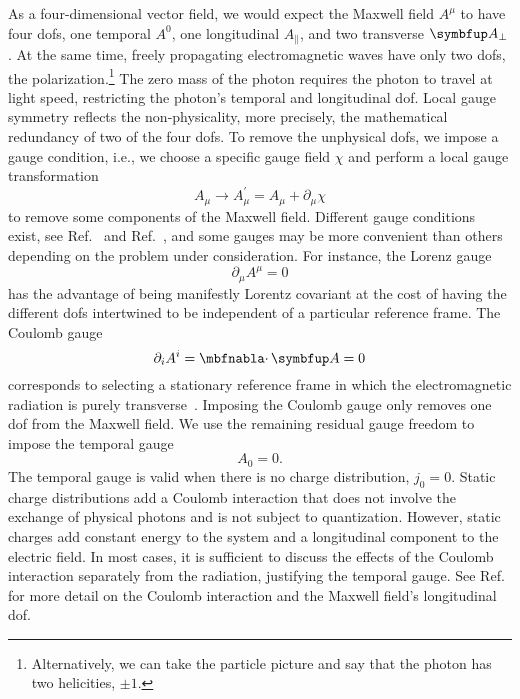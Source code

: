 As a four-dimensional vector field, we would expect the Maxwell field $A^\mu$ to have four \gls{dof}s, one temporal $A^0$, one longitudinal $A_\parallel$, and two transverse $\vb{A}_\perp$.
At the same time, freely propagating electromagnetic waves have only two \gls{dof}s, the polarization.\footnote{Alternatively, we can take the particle picture and say that the photon has two helicities, $\pm1$.}
The zero mass of the photon requires the photon to travel at light speed, restricting the photon's temporal and longitudinal \gls{dof}.
Local gauge symmetry reflects the non-physicality, more precisely, the mathematical redundancy of two of the four \gls{dof}s.
To remove the unphysical \gls{dof}s, we impose a gauge condition, i.e., we choose a specific gauge field $\chi$ and perform a local gauge transformation
\begin{equation}
	A_\mu
	\to
	A_\mu^\prime
	=
	A_\mu
	+
	\partial_\mu\chi
\end{equation}
to remove some components of the Maxwell field.
Different gauge conditions exist, see Ref.~\cite[p.~144]{Greiner2013} and Ref.~\cite[p.~339]{Srednicki2007}, and some gauges may be more convenient than others depending on the problem under consideration.
For instance, the Lorenz gauge
\begin{equation}
	\partial_\mu
	A^\mu
	=
	0	
\end{equation}
has the advantage of being manifestly Lorentz covariant at the cost of having the different \gls{dof}s intertwined to be independent of a particular reference frame.
The Coulomb gauge
\begin{equation}
	\partial_i
	A^i
	=
	\div\vb{A}
	=
	0
	\label{eq:coulomb_gauge}
\end{equation}
corresponds to selecting a stationary reference frame in which the electromagnetic radiation is purely transverse~\cite[p.~40]{Bogoliubov1982}.
Imposing the Coulomb gauge only removes one \gls{dof} from the Maxwell field.
We use the remaining residual gauge freedom to impose the temporal gauge
\begin{equation}
	A_0
	=
	0
	\label{eq:temporal_gauge}
	.
\end{equation}
The temporal gauge is valid when there is no charge distribution, $j_0=0$.
Static charge distributions add a Coulomb interaction that does not involve the exchange of physical photons and is not subject to quantization.
However, static charges add constant energy to the system and a longitudinal component to the electric field.
In most cases, it is sufficient to discuss the effects of the Coulomb interaction separately from the radiation, justifying the temporal gauge.
See Ref.~\cite[p.~145,187,200]{Greiner2013} for more detail on the Coulomb interaction and the Maxwell field's longitudinal \gls{dof}.

